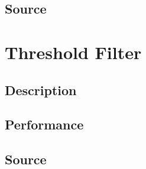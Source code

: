 \documentclass[a4paper, 12pt]{article}
\begin{document}
\subsection{Source}

\section{Threshold Filter}
\subsection{Description}
\subsection{Performance}
\subsection{Source}
\end{document}

